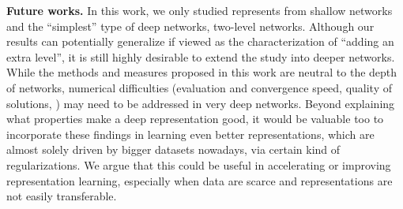 \documentclass[10pt,twocolumn,letterpaper]{article}
\begin{document}
{\bf Future works.} In this work, we only studied represents from shallow networks and the ``simplest'' type of deep networks, two-level networks.
Although our results can potentially generalize if viewed as the characterization of ``adding an extra level'', it is still highly desirable to extend the study into deeper networks.
While the methods and measures proposed in this work are neutral to the depth of networks, numerical difficulties (\eg evaluation and convergence speed, quality of solutions, \etc) may need to be addressed in very deep networks.
Beyond explaining what properties make a deep representation good, it would be valuable too to incorporate these findings in learning even better representations, which are almost solely driven by bigger datasets nowadays, via certain kind of regularizations.  
We argue that this could be useful in accelerating or improving representation learning, especially when data are scarce and representations are not easily transferable.




{\small


}
\end{document}
